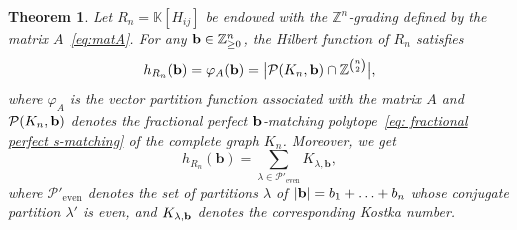 \documentclass[12pt,a4paper]{extarticle}
\newtheorem{theorem}{Theorem}[section]
\theoremstyle{definition}
\newcommand{\K}{\mathbb{K}}
\begin{document}
\begin{theorem}\label{thm: main Rn sec 3}
Let $R_n=\K[H_{ij}]$ be endowed with the $\mathbb{Z}^n$‑grading defined by
the matrix $A$~\eqref{eq:matA}.
For any ${\bf b}\in\mathbb{Z}_{\ge0}^n$, the Hilbert function of $R_n$ satisfies
$$
h_{R_n}({\bf b})
= \varphi_A({\bf b}) =
\bigl|\mathcal{P}(K_n,{\bf b})\cap\mathbb{Z}^{\binom{n}{2}}\bigr|,
$$
where $\varphi_A$ is the vector partition function associated with the matrix $A$ and $\mathcal{P}(K_n,{\bf b})$ denotes the fractional perfect ${\bf b}$‑matching polytope~\eqref{eq: fractional perfect s-matching}
of the complete graph $K_n$.
Moreover, we get
\begin{equation}
    h_{R_n}(\mathbf{b}) = \sum_{\lambda \in \mathcal{P}'_{\mathrm{even}}} K_{\lambda, \mathbf{b}},
\end{equation}
where $\mathcal{P}'_{\mathrm{even}}$ denotes the set of partitions $\lambda$ of $|{\bf b}| = b_1 + \ldots + b_n$ whose
conjugate partition $\lambda'$ is even, and $K_{\lambda,{\bf b}}$ denotes the corresponding Kostka number.
\end{theorem}
\end{document}
